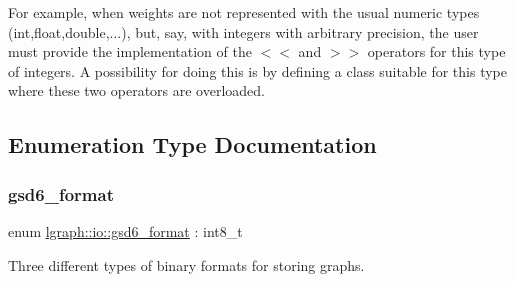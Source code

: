 For example, when weights are not represented with the usual numeric types (int,float,double,...), but, say, with integers with arbitrary precision, the user must provide the implementation of the \textquotesingle{}$<$$<$\textquotesingle{} and \textquotesingle{}$>$$>$\textquotesingle{} operators for this type of integers. A possibility for doing this is by defining a class suitable for this type where these two operators are overloaded. 

\subsection{Enumeration Type Documentation}
\mbox{\label{namespacelgraph_1_1io_ad0917668d35430ffe13d455d687be4ff}} 
\subsubsection{\texorpdfstring{gsd6\+\_\+format}{gsd6\_format}}
{\footnotesize\ttfamily enum \hyperlink{namespacelgraph_1_1io_ad0917668d35430ffe13d455d687be4ff}{lgraph\+::io\+::gsd6\+\_\+format} \+: int8\+\_\+t\hspace{0.3cm}{\ttfamily [strong]}}



Three different types of binary formats for storing graphs. 

